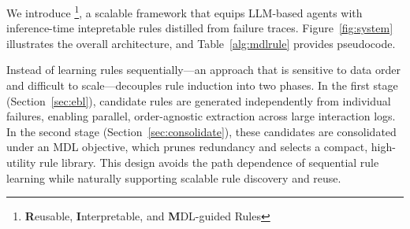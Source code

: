 

We introduce \shortname\footnote{\textbf{R}eusable, \textbf{I}nterpretable, and \textbf{M}DL-guided Rules}, a scalable framework that equips LLM-based agents with inference-time intepretable rules distilled from failure traces. 
Figure~\ref{fig:system} illustrates the overall architecture, and Table~\ref{alg:mdlrule} provides pseudocode.


Instead of learning rules sequentially—an approach that is sensitive to data order and difficult to scale—\shortname decouples rule induction into two phases. In the first stage (Section~\ref{sec:ebl}), candidate rules are generated independently from individual failures, enabling parallel, order-agnostic extraction across large interaction logs. In the second stage (Section~\ref{sec:consolidate}), these candidates are consolidated under an MDL objective, which prunes redundancy and selects a compact, high-utility rule library. This design avoids the path dependence of sequential rule learning while naturally supporting scalable rule discovery and reuse. 

